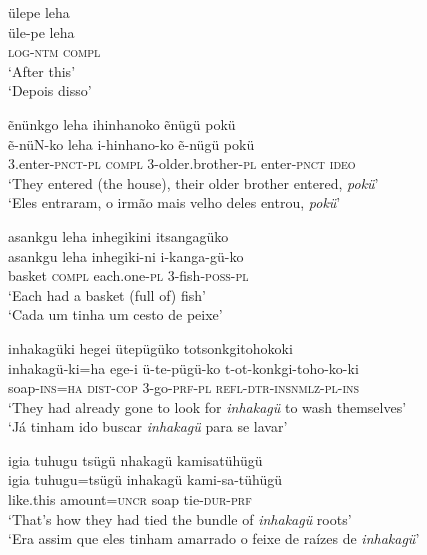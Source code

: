 \documentclass[output=paper,
modfonts,nonflat
]{langsci/langscibook}
\begin{document}
\ea ülepe leha \\[.3em]
\gll üle-pe		leha \\
\textsc{log-ntm} 	\textsc{compl} \\
\glt ‘After this’ \\
‘Depois disso’ \\
\z

\ea ẽnünkgo leha ihinhanoko ẽnügü pokü \\[.3em]
\gll ẽ-nüN-ko	leha	i-hinhano-ko		ẽ-nügü		pokü{\footnotemark}{} \\
3.enter-\textsc{pnct-pl} 	\textsc{compl}	3-older.brother\textsc{-pl} 	enter-\textsc{pnct}	\textsc{ideo} \\
\glt ‘They entered (the house), their older brother entered, \textit{pokü}’ \\
‘Eles entraram, o irmão mais velho deles entrou, \textit{pokü}’ \\
\z

\newpage 
\ea asankgu leha inhegikini itsangagüko \\[.3em]
\gll asankgu	leha	inhegiki-ni	i-kanga-gü-ko \\
basket 		\textsc{compl}	each.one\textsc{-pl} 	3-fish\textsc{-poss-pl} \\
\glt ‘Each had a basket (full of) fish’  \\
‘Cada um tinha um cesto de peixe’ \\
\z

\ea inhakagüki{\footnotemark}{} hegei ütepügüko totsonkgitohokoki \\[.3em]
\gll inhakagü-ki=ha	ege-i		ü-te-pügü-ko	t-ot-konkgi-toho-ko-ki \\
soap-\textsc{ins=ha} 	\textsc{dist-cop} 	3-go\textsc{-prf-pl}	\textsc{refl-dtr-insnmlz-pl-ins} \\
\glt ‘They had already gone to look for \emph{inhakagü} to wash themselves’ \\
‘Já tinham ido buscar \emph{inhakagü} para se lavar’\\
\z

\ea igia tuhugu tsügü nhakagü kamisatühügü \\[.3em]
\gll igia		tuhugu=tsügü		inhakagü	kami-sa-tühügü \\
like.this 	amount=\textsc{uncr} 	soap 		tie-\textsc{dur-prf} \\
\glt ‘That's how they had tied the bundle of \emph{inhakagü} roots’ \\
‘Era assim que eles tinham amarrado o feixe de raízes de \emph{inhakagü}’ \\
\z
\end{document}
